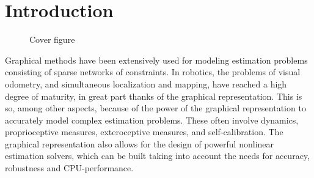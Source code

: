 
\section{Introduction}\label{sec:intro}


\cite{wensing2017proprioceptive}

\begin{figure}
\centering
	\caption{Cover figure}
	\label{fig:cover}
\end{figure}

Graphical methods have been extensively used for modeling estimation problems consisting of sparse networks of constraints. 
In robotics, the problems of visual odometry, and simultaneous localization and mapping, have reached a high degree of maturity, in great part thanks of the graphical representation. 
This is so, among other aspects, because of the power of the graphical representation to accurately model complex estimation problems. 
These often involve dynamics, proprioceptive measures, exteroceptive measures, and self-calibration. 
The graphical representation also allows for the design of powerful nonlinear estimation solvers, which can be built taking into account the needs for accuracy, robustness and CPU-performance.
